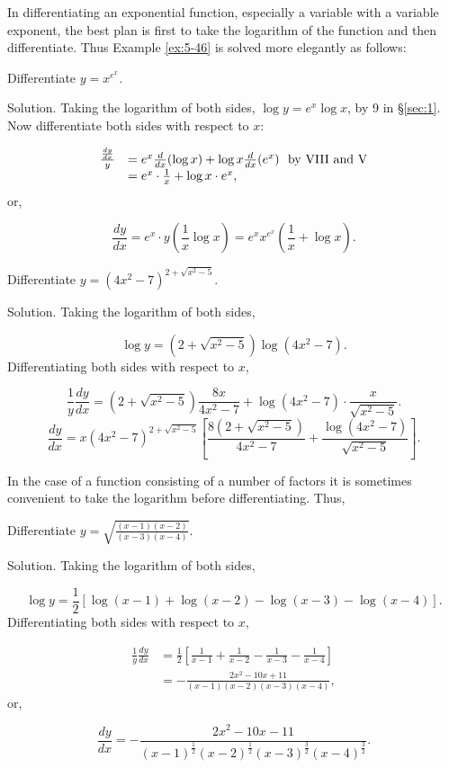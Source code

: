 In differentiating an exponential function, especially a variable 
with a variable exponent, the best plan is first to take the logarithm of 
the function and then differentiate. Thus Example \ref{ex:5-46} %
is solved more elegantly as follows:

\begin{example}
{\rm
Differentiate $y = x^{e^x}$.

Solution. Taking the logarithm of both sides, $\log y = e^x\log x$, by 9 in \S \ref{sec:1}.
Now differentiate both sides with respect to $x$:

\[
\begin{array}{ll}
\frac{\frac{dy}{dx}}{y} 
&	= e^x \frac{d}{dx} (\log x) + \log x \frac{d}{dx} (e^x)   \ \ {\rm by\ VIII\ and\ V}\\
&  	= e^x \cdot \frac{1}{x} + \log x \cdot e^x,
\end{array}
\]
or, 	

\[
\frac{dy}{dx} 	= e^x \cdot y \left ( \frac{1}{x} \log x \right )
  	= e^x x^{e^x} \left ( \frac{1}{x} + \log x \right ).
\]
}
\end{example}

\begin{example}
{\rm
Differentiate $y = (4x^2 - 7)^{2 + \sqrt{x^2 - 5}}$.

Solution. Taking the logarithm of both sides,

\[
    \log y = (2 + \sqrt{x^2 - 5}) \log (4x^2 - 7).
\]
Differentiating both sides with respect to $x$,

\[
    \frac{1}{y} \frac{dy}{dx} 	= (2 + \sqrt{x^2 - 5}) \frac{8x}{4x^2 - 7} + \log(4x^2 - 7) \cdot \frac{x}{\sqrt{x^2 - 5}}.
\]
\[
    \frac{dy}{dx} 	= x(4x^2 - 7)^{2 + \sqrt{x^2 - 5}} \left [ \frac{8(2 + \sqrt{x^2 - 5})}{4x^2 - 7} + \frac{\log (4x^2 - 7)}{\sqrt{x^2 - 5}} \right ]. 
\]
}
\end{example}

In the case of a function consisting of a number of factors it is sometimes 
convenient to take the logarithm before differentiating. Thus,

\begin{example}
{\rm
Differentiate $y = \sqrt{\frac{(x - 1)(x - 2)}{(x - 3)(x - 4)}}$.

Solution. Taking the logarithm of both sides,

\[
    \log y = \frac{1}{2} [\log (x -1) + \log (x - 2) - \log(x - 3) - \log(x - 4)].
\]
Differentiating both sides with respect to $x$,

\[
\begin{array}{ll}
\frac{1}{y} \frac{dy}{dx} &= \frac{1}{2} \left [ \frac{1}{x - 1} + \frac{1}{x - 2} - \frac{1}{x - 3} - \frac{1}{x - 4} \right ]\\
&	= -\frac{2x^2 - 10x + 11}{(x - 1)(x - 2)(x - 3)(x - 4)},
\end{array}
\]
or, 

\[
\frac{dy}{dx} 	= -\frac{2x^2 - 10x - 11}{(x - 1)^{\frac{1}{2}} (x - 2)^{\frac{1}{2}} ( x - 3)^{\frac{3}{2}} (x - 4)^{\frac{3}{2}}}.
\]
}
\end{example}

